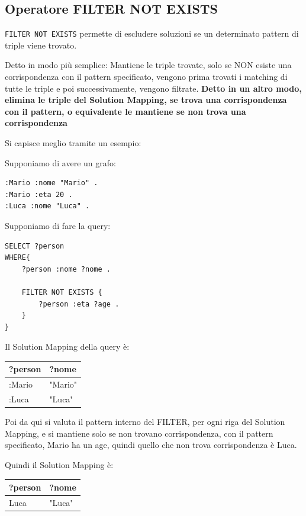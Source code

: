 \newpage

\subsection{Operatore FILTER NOT EXISTS}

\texttt{FILTER NOT EXISTS} permette di escludere soluzioni se un determinato pattern di triple viene trovato.

Detto in modo più semplice: Mantiene le triple trovate, solo se NON esiste una corrispondenza con il pattern specificato, vengono prima trovati i matching di tutte le triple e poi successivamente, vengono filtrate.
\textbf{Detto in un altro modo, elimina le triple del Solution Mapping, se trova una corrispondenza con il pattern, o equivalente le mantiene se non trova una corrispondenza}



Si capisce meglio tramite un esempio:

Supponiamo di avere un grafo:

\begin{verbatim}
:Mario :nome "Mario" .
:Mario :eta 20 .
:Luca :nome "Luca" .
\end{verbatim}

Supponiamo di fare la query:

\begin{verbatim}
SELECT ?person
WHERE{
    ?person :nome ?nome .

    FILTER NOT EXISTS {
        ?person :eta ?age .
    }
}
\end{verbatim}

Il Solution Mapping della query è:

\begin{table}[h!]
\centering
\begin{tabular}{|l|l|}
\hline
\textbf{?person} & \textbf{?nome} \\ \hline
:Mario & "Mario" \\ \hline
:Luca & "Luca" \\ \hline
\end{tabular}
\end{table}

Poi da qui si valuta il pattern interno del FILTER, per ogni riga del Solution Mapping, e si mantiene solo se non trovano corrispondenza, con il pattern specificato, Mario ha un age, quindi quello che non trova corrispondenza è Luca.

Quindi il Solution Mapping è:

\begin{table}[h!]
\centering
\begin{tabular}{|l|l|}
\hline
\textbf{?person} & \textbf{?nome} \\ \hline
Luca & "Luca" \\ \hline
\end{tabular}
\end{table}

